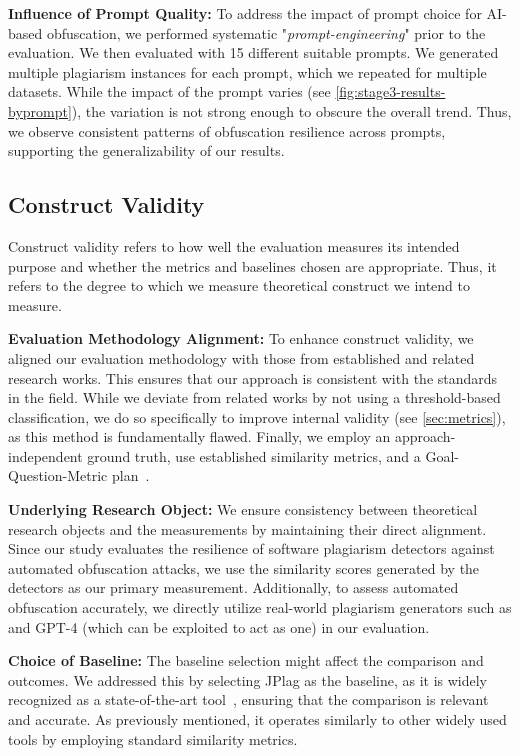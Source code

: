     \textbf{Influence of Prompt Quality:} To address the impact of prompt choice for AI-based obfuscation, we performed systematic "\textit{prompt-engineering}" prior to the evaluation. We then evaluated with 15 different suitable prompts. We generated multiple plagiarism instances for each prompt, which we repeated for multiple datasets. While the impact of the prompt varies (see \autoref{fig:stage3-results-byprompt}), the variation is not strong enough to obscure the overall trend. Thus, we observe consistent patterns of obfuscation resilience across prompts, supporting the generalizability of our results.

\subsection{Construct Validity}
Construct validity refers to how well the evaluation measures its intended purpose and whether the metrics and baselines chosen are appropriate. Thus, it refers to the degree to which we measure theoretical construct we intend to measure.

    \textbf{Evaluation Methodology Alignment:} To enhance construct validity, we aligned our evaluation methodology with those from established and related research works. This ensures that our approach is consistent with the standards in the field. While we deviate from related works by not using a threshold-based classification, we do so specifically to improve internal validity (see \autoref{sec:metrics}), as this method is fundamentally flawed. Finally, we employ an approach-independent ground truth, use established similarity metrics, and a Goal-Question-Metric plan~\cite{Basili1984, Basili1992}.

    \textbf{Underlying Research Object:} We ensure consistency between theoretical research objects and the measurements by maintaining their direct alignment. Since our study evaluates the resilience of software plagiarism detectors against automated obfuscation attacks, we use the similarity scores generated by the detectors as our primary measurement. Additionally, to assess automated obfuscation accurately, we directly utilize real-world plagiarism generators such as \mossad and GPT-4 (which can be exploited to act as one) in our evaluation.
    
    \textbf{Choice of Baseline:} The baseline selection might affect the comparison and outcomes. We addressed this by selecting JPlag as the baseline, as it is widely recognized as a state-of-the-art tool~\cite{Aniceto2021, Novak2019}, ensuring that the comparison is relevant and accurate. As previously mentioned, it operates similarly to other widely used tools by employing standard similarity metrics.

